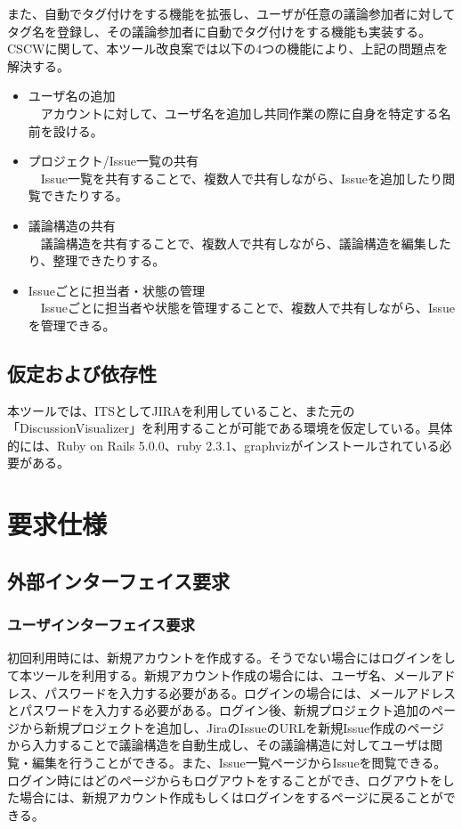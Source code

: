 \documentclass[12pt, oneside]{jreport}
\begin{document}
	また、自動でタグ付けをする機能を拡張し、ユーザが任意の議論参加者に対してタグ名を登録し、その議論参加者に自動でタグ付けをする機能も実装する。
	\\
	
	CSCWに関して、本ツール改良案では以下の4つの機能により、上記の問題点を解決する。
	\begin{itemize}
		\item ユーザ名の追加
		\\
		　アカウントに対して、ユーザ名を追加し共同作業の際に自身を特定する名前を設ける。
		\item プロジェクト/Issue一覧の共有
		\\
		　Issue一覧を共有することで、複数人で共有しながら、Issueを追加したり閲覧できたりする。
		\item 議論構造の共有
		\\
		　議論構造を共有することで、複数人で共有しながら、議論構造を編集したり、整理できたりする。
		\item Issueごとに担当者・状態の管理
		\\
		　Issueごとに担当者や状態を管理することで、複数人で共有しながら、Issueを管理できる。
	\end{itemize}

	\section{仮定および依存性}
	本ツールでは、ITSとしてJIRAを利用していること、また元の「DiscussionVisualizer」を利用することが可能である環境を仮定している。具体的には、Ruby on Rails 5.0.0、ruby 2.3.1、graphvizがインストールされている必要がある。

\chapter{要求仕様}

	\section{外部インターフェイス要求}
		
		\subsection{ユーザインターフェイス要求}

		初回利用時には、新規アカウントを作成する。そうでない場合にはログインをして本ツールを利用する。新規アカウント作成の場合には、ユーザ名、メールアドレス、パスワードを入力する必要がある。ログインの場合には、メールアドレスとパスワードを入力する必要がある。ログイン後、新規プロジェクト追加のページから新規プロジェクトを追加し、JiraのIssueのURLを新規Issue作成のページから入力することで議論構造を自動生成し、その議論構造に対してユーザは閲覧・編集を行うことができる。また、Issue一覧ページからIssueを閲覧できる。ログイン時にはどのページからもログアウトをすることができ、ログアウトをした場合には、新規アカウント作成もしくはログインをするページに戻ることができる。
\end{document}
